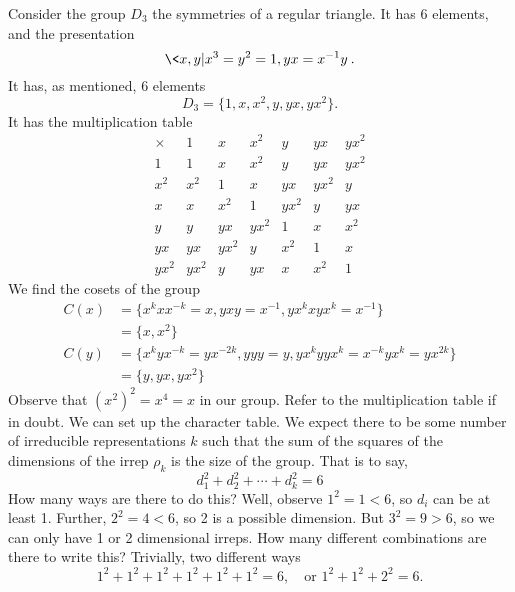 Consider the group $D_3$ the symmetries of a regular
triangle. It has 6 elements, and the presentation
\begin{equation}
\<x,y|x^3=y^2=1,yx=x^{-1}y\>.
\end{equation}
It has, as mentioned, 6 elements
\begin{equation}
D_{3} = \{1,x,x^2,y,yx,yx^2\}.
\end{equation}
It has the multiplication table
\begin{equation}
\begin{array}{c|cccccc}
\times & 1   & x  & x^2 & y & yx & yx^2\\
\hline
1      & 1   & x  & x^2 & y & yx & yx^2\\
x^2    & x^2  & 1 & x   & yx & yx^2 & y\\ 
x      & x   & x^2 & 1 & yx^2 & y & yx\\
y      & y   & yx & yx^2 & 1 & x & x^2\\
yx     & yx  & yx^2 & y & x^2 & 1 & x\\
yx^2   & yx^2 & y & yx & x & x^2 & 1
\end{array}
\end{equation}
We find the cosets of the group
\begin{subequations}
\begin{align}
C(x) &= \{x^{k}xx^{-k}=x,
yxy=x^{-1},yx^{k}xyx^{k}=x^{-1}\}\\
&=\{x,x^2\}\\
C(y) &= \{x^kyx^{-k}=yx^{-2k}, yyy=y,
yx^{k}yyx^{k}=x^{-k}yx^{k}=yx^{2k}\}\\
&=\{y,yx,yx^2\}
\end{align}
\end{subequations}
Observe that $(x^2)^2=x^4=x$ in our group. Refer to the
multiplication table if in doubt. We can set up the
character table. We expect there to be some number of
irreducible representations $k$ such that the sum of the
squares of the dimensions of the irrep $\rho_k$ is the size
of the group. That is to say, 
\begin{equation}
d_{1}^{2} + d_{2}^{2} + \cdots + d_{k}^{2} = 6
\end{equation}
How many ways are there to do this? Well, observe $1^2=1<6$,
so $d_i$ can be at least 1. Further, $2^2=4<6$, so 2 is a
possible dimension. But $3^2=9>6$, so we can only have 1 or
2 dimensional irreps. How many different combinations are
there to write this? Trivially, two different ways
\begin{equation}
1^2+1^2+1^2+1^2+1^2+1^2=6,\quad\text{or }1^2+1^2+2^2=6.
\end{equation}
